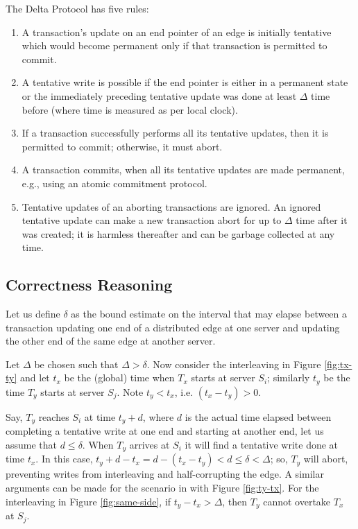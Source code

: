 \documentclass[sigplan,10pt]{acmart}
\newcommand{\tDelta}{\textsf{Delta}\xspace}
\begin{document}
The \tDelta Protocol has five rules:
\begin{enumerate}
\item A transaction's update on an end pointer of an edge is initially tentative which would become permanent only if that transaction is permitted to commit.
\item A tentative write is possible if the end pointer is either in a permanent state or the immediately preceding tentative update was done at least $\Delta$ time before (where time is measured as per local clock).
\item If a transaction successfully performs all its tentative updates, then it is permitted to commit; otherwise, it must abort.
\item A transaction commits, when all its tentative updates are made permanent, e.g., using an atomic commitment protocol.
\item Tentative updates of an aborting transactions are ignored. An ignored tentative update can make a new transaction abort for up to $\Delta$ time after it was created; it is harmless thereafter and can be garbage collected at any time.
\end{enumerate}

\subsection{Correctness Reasoning}
\label{sec:corr-reas}

Let us define $\delta$ as the bound estimate on the interval that may elapse between a transaction updating one end of a distributed edge at one server and updating the other end of the same edge at another server.

Let $\Delta$ be chosen such that $\Delta > \delta$. Now consider the interleaving in Figure \ref{fig:tx-ty} and let $t_x$ be the (global) time when $T_x$ starts at server $S_i$; similarly $t_y$ be the time $T_y$ starts at server $S_j$. Note $t_y < t_x$, i.e. $(t_x - t_y) > 0$.

Say, $T_y$ reaches $S_i$ at time $t_y + d$, where $d$ is the actual time elapsed between completing a tentative write at one end and starting at another end, let us assume that $d \leq \delta$. When $T_y$ arrives at $S_i$ it will find a tentative write done at time $t_x$. In this case, $t_y + d - t_x = d - (t_x-t_y) < d \leq \delta < \Delta$; so, $T_y$ will abort, preventing writes from interleaving and half-corrupting the edge. A similar arguments can be made for the scenario in with Figure \ref{fig:ty-tx}. For the interleaving in Figure \ref{fig:same-side}, if $t_y - t_x > \Delta$, then $T_y$ cannot overtake $T_x$ at $S_j$.
\end{document}
